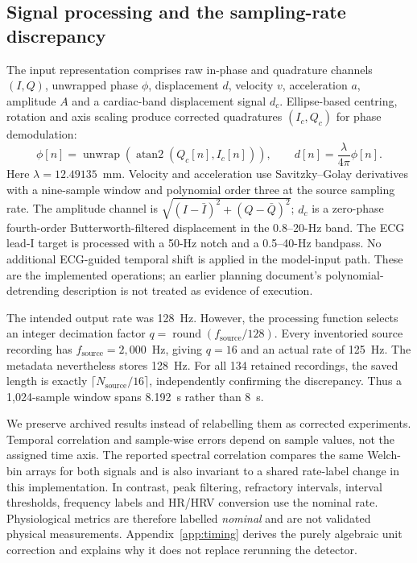 \documentclass[11pt,a4paper]{article}
\begin{document}
\subsection{Signal processing and the sampling-rate discrepancy}
\label{sec:rate}

The input representation comprises raw in-phase and quadrature channels $(I,Q)$, unwrapped
phase $\phi$, displacement $d$, velocity $v$, acceleration $a$, amplitude $A$ and a
cardiac-band displacement signal $d_c$. Ellipse-based centring, rotation and axis scaling
produce corrected quadratures $(I_c,Q_c)$ for phase demodulation:
\begin{equation}
\phi[n]=\operatorname{unwrap}\!\left(\operatorname{atan2}(Q_c[n],I_c[n])\right),
\qquad d[n]=\frac{\lambda}{4\pi}\phi[n].
\end{equation}
Here $\lambda=12.49135$~mm. Velocity and acceleration use Savitzky--Golay derivatives with
a nine-sample window and polynomial order three at the source sampling rate. The amplitude
channel is $\sqrt{(I-\bar I)^2+(Q-\bar Q)^2}$; $d_c$ is a zero-phase fourth-order
Butterworth-filtered displacement in the 0.8--20-Hz band. The ECG lead-I target is processed
with a 50-Hz notch and a 0.5--40-Hz bandpass. No additional ECG-guided temporal shift is
applied in the model-input path. These are the implemented operations; an earlier planning
document's polynomial-detrending description is not treated as evidence of execution.

The intended output rate was 128~Hz. However, the processing function selects an integer
decimation factor $q=\operatorname{round}(f_{\mathrm{source}}/128)$. Every inventoried source
recording has $f_{\mathrm{source}}=2{,}000$~Hz, giving $q=16$ and an actual rate of
125~Hz. The metadata nevertheless stores 128~Hz. For all 134 retained recordings, the saved
length is exactly $\lceil N_{\mathrm{source}}/16\rceil$, independently confirming the
discrepancy. Thus a 1,024-sample window spans 8.192~s rather than 8~s.

We preserve archived results instead of relabelling them as corrected experiments. Temporal
correlation and sample-wise errors depend on sample values, not the assigned time axis.
The reported spectral correlation compares the same Welch-bin arrays for both signals and
is also invariant to a shared rate-label change in this implementation. In contrast, peak
filtering, refractory intervals, interval thresholds, frequency labels and HR/HRV conversion
use the nominal rate. Physiological metrics are therefore labelled \emph{nominal} and are
not validated physical measurements. Appendix~\ref{app:timing} derives the purely algebraic
unit correction and explains why it does not replace rerunning the detector.
\end{document}
